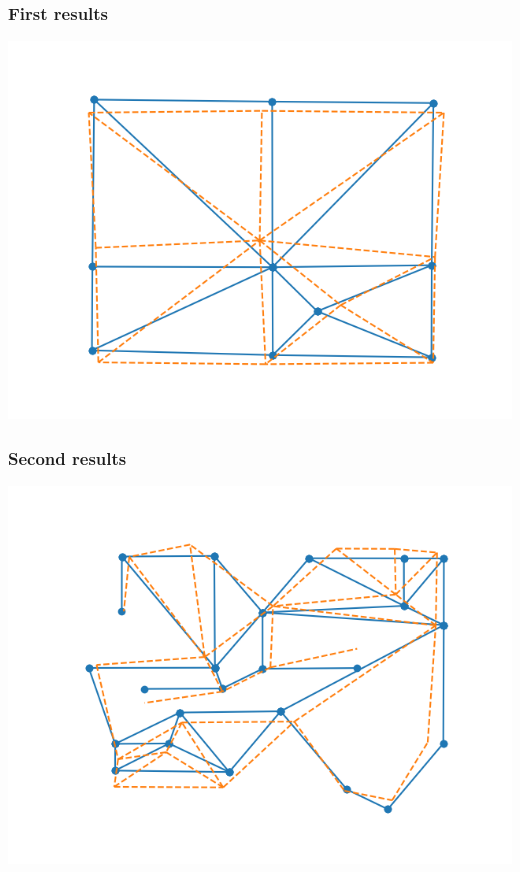 \documentclass[12pt,t,xcolor=dvipsnames]{beamer}
\begin{document}
\begin{frame}
  \frametitle{First results}
\begin{center}
  \includegraphics[width=\linewidth]{map1}
\end{center}
\end{frame}

\begin{frame}
  \frametitle{Second results}
\begin{center}
  \includegraphics[width=\linewidth]{map2}
\end{center}
  

\end{frame}
\end{document}
